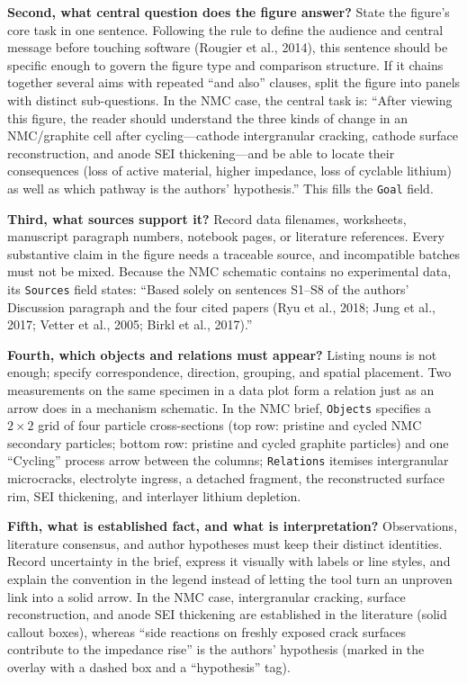 \textbf{Second, what central question does the figure answer?} State the figure's core task in one sentence. Following the rule to define the audience and central message before touching software (Rougier et al., 2014), this sentence should be specific enough to govern the figure type and comparison structure. If it chains together several aims with repeated ``and also'' clauses, split the figure into panels with distinct sub-questions. In the NMC case, the central task is: ``After viewing this figure, the reader should understand the three kinds of change in an NMC/graphite cell after cycling---cathode intergranular cracking, cathode surface reconstruction, and anode SEI thickening---and be able to locate their consequences (loss of active material, higher impedance, loss of cyclable lithium) as well as which pathway is the authors' hypothesis.'' This fills the \texttt{Goal} field.

\textbf{Third, what sources support it?} Record data filenames, worksheets, manuscript paragraph numbers, notebook pages, or literature references. Every substantive claim in the figure needs a traceable source, and incompatible batches must not be mixed. Because the NMC schematic contains no experimental data, its \texttt{Sources} field states: ``Based solely on sentences S1--S8 of the authors' Discussion paragraph and the four cited papers (Ryu et al., 2018; Jung et al., 2017; Vetter et al., 2005; Birkl et al., 2017).''

\textbf{Fourth, which objects and relations must appear?} Listing nouns is not enough; specify correspondence, direction, grouping, and spatial placement. Two measurements on the same specimen in a data plot form a relation just as an arrow does in a mechanism schematic. In the NMC brief, \texttt{Objects} specifies a $2\times 2$ grid of four particle cross-sections (top row: pristine and cycled NMC secondary particles; bottom row: pristine and cycled graphite particles) and one ``Cycling'' process arrow between the columns; \texttt{Relations} itemises intergranular microcracks, electrolyte ingress, a detached fragment, the reconstructed surface rim, SEI thickening, and interlayer lithium depletion.

\textbf{Fifth, what is established fact, and what is interpretation?} Observations, literature consensus, and author hypotheses must keep their distinct identities. Record uncertainty in the brief, express it visually with labels or line styles, and explain the convention in the legend instead of letting the tool turn an unproven link into a solid arrow. In the NMC case, intergranular cracking, surface reconstruction, and anode SEI thickening are established in the literature (solid callout boxes), whereas ``side reactions on freshly exposed crack surfaces contribute to the impedance rise'' is the authors' hypothesis (marked in the overlay with a dashed box and a ``hypothesis'' tag).

